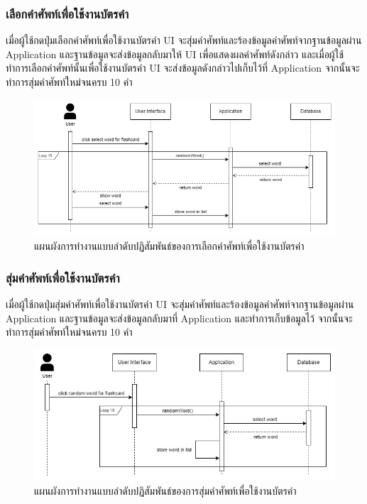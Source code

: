 \documentclass[12pt,oneside,openright,a4paper]{cpe-thai-project}
\begin{document}
\subsubsection{เลือกคำศัพท์เพื่อใช้งานบัตรคำ}
\hspace{1cm}
เมื่อผู้ใช้กดปุ่มเลือกคำศัพท์เพื่อใช้งานบัตรคำ UI จะสุ่มคำศัพท์และร้องข้อมูลคำศัพท์จากฐานข้อมูลผ่าน Application
และฐานข้อมูลจะส่งข้อมูลกลับมาให้ UI เพื่อแสดงผลคำศัพท์ดังกล่าว และเมื่อผู้ใช้ทำการเลือกคำศัพท์นั้นเพื่อใช้งานบัตรคำ
UI จะส่งข้อมูลดังกล่าวไปเก็บไว้ที่ Application จากนั้นจะทำการสุ่มคำศัพท์ใหม่จนครบ 10 คำ
\begin{figure}[!h]\centering
	\includegraphics[width=\textwidth, keepaspectratio=true]{image/chap3/sequence/Flash-Select.jpg}
	\caption{แผนผังการทำงานแบบลำดับปฏิสัมพันธ์ของการเลือกคำศัพท์เพื่อใช้งานบัตรคำ}\label{fig:S_SelectFlashcard}
\end{figure}

\subsubsection{สุ่มคำศัพท์เพื่อใช้งานบัตรคำ}
\hspace{1cm}
เมื่อผู้ใช้กดปุ่มสุ่มคำศัพท์เพื่อใช้งานบัตรคำ UI จะสุ่มคำศัพท์และร้องข้อมูลคำศัพท์จากฐานข้อมูลผ่าน Application
และฐานข้อมูลจะส่งข้อมูลกลับมาที่ Application และทำการเก็บข้อมูลไว้ จากนั้นจะทำการสุ่มคำศัพท์ใหม่จนครบ 10 คำ
\begin{figure}[!h]\centering
	\includegraphics[width=\textwidth, keepaspectratio=true]{image/chap3/sequence/Flash-Random.jpg}
	\caption{แผนผังการทำงานแบบลำดับปฏิสัมพันธ์ของการสุ่มคำศัพท์เพื่อใช้งานบัตรคำ}\label{fig:S_RandomFlashcard}
\end{figure}
\end{document}
